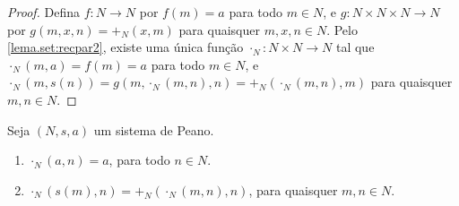 \begin{proof} 
    Defina $f : N \to N$ por $f(m) = a$ para todo $m \in N$, e $g : N \times N \times N \to N$ por $g(m,x,n) = +_N(x,m)$ para quaisquer $m,x,n \in N$. Pelo \cref{lema.set:recpar2}, existe uma única função $\cdot_N : N \times N \to N$ tal que $\cdot_N(m,a) = f(m) = a$ para todo $m \in N$, e $\cdot_N(m,s(n)) = g(m,\cdot_N(m,n),n) = +_N(\cdot_N(m,n),m)$ para quaisquer $m,n \in N$. \blackproof
\end{proof}

\begin{lemma} \label{lema.set:comutatividade_produto_naturais}
    Seja $(N,s,a)$ um sistema de Peano.
        \begin{enumerate}[leftmargin=*, align=left, label=\textbf{(\alph*)}]
            \item $\cdot_N (a, n) = a$, para todo $n \in N$.
            \item $\cdot_N (s(m),n) = +_N (\cdot_N (m,n), n)$, para quaisquer $m,n \in N$.
        \end{enumerate}
\end{lemma}

